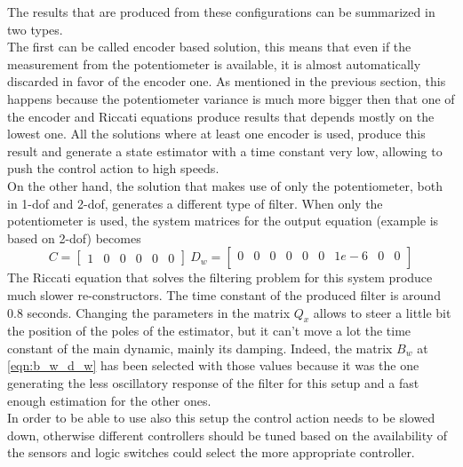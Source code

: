 The results that are produced from these configurations can be summarized in two types. \\ 

The first can be called encoder based solution, this means that even if the measurement from the potentiometer is available, it is almost automatically discarded in favor of the encoder one. As mentioned in the previous section, this happens because the potentiometer variance is much more bigger then that one of the encoder and Riccati equations produce results that depends mostly on the lowest one. All the solutions where at least one encoder is used, produce this result and generate a state estimator with a time constant very low, allowing to push the control action to high speeds.\\

On the other hand, the solution that makes use of only the potentiometer, both in \acrshort{1-dof} and \acrshort{2-dof}, generates a different type of filter. When only the potentiometer is used, the system matrices for the output equation (example is based on \acrshort{2-dof}) becomes 
\begin{equation}
	C = \begin{bmatrix}
		1 & 0 & 0 & 0 & 0 & 0
	\end{bmatrix} \
	D_w = \begin{bmatrix}
		0 & 0 & 0 & 0 & 0 & 0 & 1e-6 & 0 & 0 \\
	\end{bmatrix} 
\end{equation}
The Riccati equation that solves the filtering problem for this system produce much slower re-constructors. The time constant of the produced filter is around 0.8 seconds. Changing the parameters in the matrix $Q_x$ allows to steer a little bit the position of the poles of the estimator, but it can't move a lot the time constant of the main dynamic, mainly its damping. Indeed, the matrix $B_w$ at \ref{eqn:b_w_d_w} has been selected with those values because it was the one generating the less oscillatory response of the filter for this setup and a fast enough estimation for the other ones.\\

In order to be able to use also this setup the control action needs to be slowed down, otherwise different controllers should be tuned based on the availability of the sensors and logic switches could select the more appropriate controller.\\

